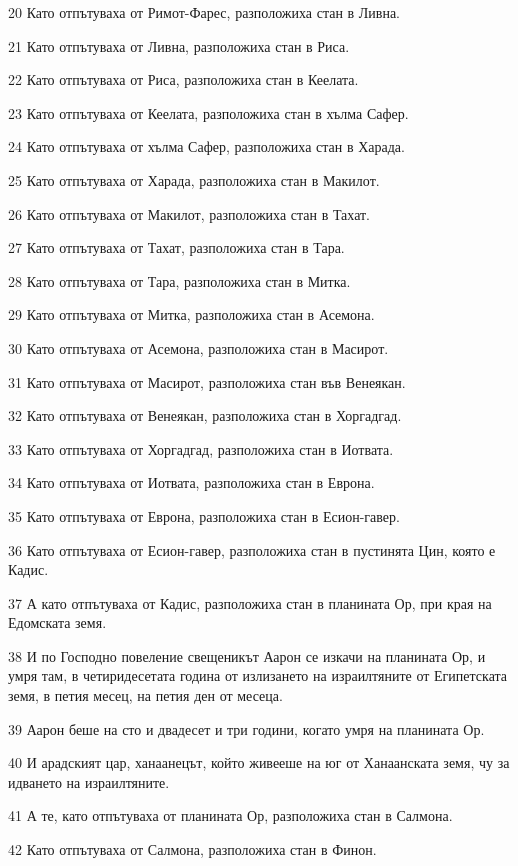\par 20 Като отпътуваха от Римот-Фарес, разположиха стан в Ливна.
\par 21 Като отпътуваха от Ливна, разположиха стан в Риса.
\par 22 Като отпътуваха от Риса, разположиха стан в Кеелата.
\par 23 Като отпътуваха от Кеелата, разположиха стан в хълма Сафер.
\par 24 Като отпътуваха от хълма Сафер, разположиха стан в Харада.
\par 25 Като отпътуваха от Харада, разположиха стан в Макилот.
\par 26 Като отпътуваха от Макилот, разположиха стан в Тахат.
\par 27 Като отпътуваха от Тахат, разположиха стан в Тара.
\par 28 Като отпътуваха от Тара, разположиха стан в Митка.
\par 29 Като отпътуваха от Митка, разположиха стан в Асемона.
\par 30 Като отпътуваха от Асемона, разположиха стан в Масирот.
\par 31 Като отпътуваха от Масирот, разположиха стан във Венеякан.
\par 32 Като отпътуваха от Венеякан, разположиха стан в Хоргадгад.
\par 33 Като отпътуваха от Хоргадгад, разположиха стан в Иотвата.
\par 34 Като отпътуваха от Иотвата, разположиха стан в Еврона.
\par 35 Като отпътуваха от Еврона, разположиха стан в Есион-гавер.
\par 36 Като отпътуваха от Есион-гавер, разположиха стан в пустинята Цин, която е Кадис.
\par 37 А като отпътуваха от Кадис, разположиха стан в планината Ор, при края на Едомската земя.
\par 38 И по Господно повеление свещеникът Аарон се изкачи на планината Ор, и умря там, в четиридесетата година от излизането на израилтяните от Египетската земя, в петия месец, на петия ден от месеца.
\par 39 Аарон беше на сто и двадесет и три години, когато умря на планината Ор.
\par 40 И арадският цар, ханаанецът, който живееше на юг от Ханаанската земя, чу за идването на израилтяните.
\par 41 А те, като отпътуваха от планината Ор, разположиха стан в Салмона.
\par 42 Като отпътуваха от Салмона, разположиха стан в Финон.
